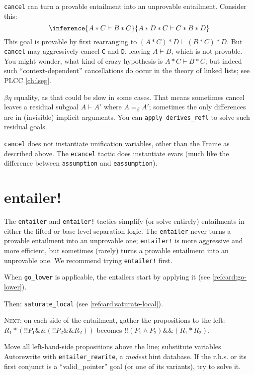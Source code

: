 \documentclass[12pt,fleqn,openany,oneside,showtrims]{memoir}
\newcommand{\ychapter}[2]{\chapter[#1]{#1}}
\begin{document}
\label{refcard:cancel-warning}
\lstinline{cancel} can turn a provable entailment
into an unprovable entailment.  Consider this:
\[\inference{A*C \vdash B*C}{A*D*C \vdash  C*B*D}\]
This goal is provable by first rearranging to
$(A*C)*D \vdash (B*C)*D$. But \lstinline{cancel}
may aggressively cancel \lstinline{C} and \lstinline{D},
leaving $A \vdash B$, which is not provable.
You might wonder, what kind of crazy hypothesis is $A*C \vdash B*C$;
but indeed such ``context-dependent'' cancellations do occur
in the theory of linked lists; see
PLCC \autoref{ch:lseg}.

 $\beta\eta$ equality,\label{cancel-beta}
as that could be slow in some cases.  That means sometimes
cancel leaves a residual subgoal $A\vdash A'$ where $A=_\beta A'$;
sometimes the only differences are in (invisible) implicit arguments.
You can \lstinline{apply derives_refl} to solve such residual goals.

  \lstinline{cancel} does not
instantiate unification variables, other than the Frame as described above.
The \lstinline{ecancel} tactic does instantiate evars
(much like the difference between \lstinline{assumption} and \lstinline{eassumption}).

\ychapter{entailer!}{(PLCC Ch.~\ref{ch:clight-auto})}
\label{refcard:entailer}
The \lstinline{entailer} and \lstinline{entailer!} tactics
simplify (or solve entirely) entailments in either the
lifted or base-level separation logic.  The \lstinline{entailer}
never turns a provable entailment into an unprovable one;
\lstinline{entailer!} is more aggressive and more efficient,
but sometimes (rarely) turns a provable entailment into an unprovable one.
We recommend trying \lstinline{entailer!} first.

When \lstinline{go_lower} is applicable, the entailers start by applying it
(see \autoref{refcard:go-lower}).

Then: \lstinline{saturate_local} (see \autoref{refcard:saturate-local}).

\textsc{Next:} on each side of the entailment, gather the propositions to the left:
\(
R_1 * (!!P_1 \&\& (!!P_2 \&\& R_2))\)
becomes
\(!!(P_1 \wedge P_2) \&\& (R_1 * R_2)\).

Move all left-hand-side propositions above the line; substitute variables.
Autorewrite with \lstinline{entailer_rewrite}, a \emph{modest} hint database.
If the r.h.s. or its first conjunct is a ``valid\_pointer'' goal (or one of its variants), try to solve it.
\end{document}
